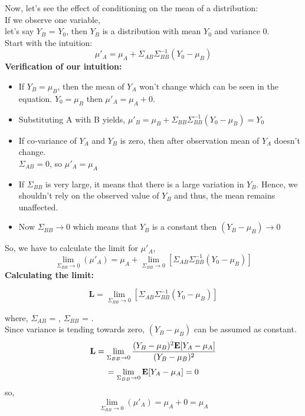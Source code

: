 \documentclass[12pt]{article}
\begin{document}
 \noindent
 Now, let's see the effect of conditioning on the mean of a distribution:\\
If we observe one variable,\\
 let's say $Y_B$ = $Y_0$, then $Y_B$ is a distribution with mean $Y_0$ and variance 0. \\
 Start with the intuition:  \\
 
 
 \begin{equation}
     \mu'_A = \mu_A + \Sigma_{AB}\Sigma_{BB}^{-1}(Y_0-\mu_B)
 \end{equation}
\textbf{Verification of our intuition:}
\begin{itemize}
    \item If $Y_B = \mu_B$, then the mean of $Y_A$ won't change which can be seen in the equation. $Y_0 = \mu_B$ then $\mu'_A = \mu_A + 0$.
    \item Substituting A with B yields, $\mu'_B = \mu_B + \Sigma_{BB}\Sigma_{BB}^{-1}(Y_0-\mu_B)=Y_0$ 
    \item If co-variance of $Y_A$ and $Y_B$ is zero, then after observation mean of $Y_A$ doesn't change.\\
    $\Sigma_{AB}=0$, so $\mu'_A = \mu_A $
    \item If $\Sigma_{BB}$ is very large, it means that there is a large variation in $Y_B$. Hence, we shouldn't rely on the observed value of $Y_B$  and thus, the mean remains unaffected.
    \item Now $\Sigma_{BB}\rightarrow0$ which means that $Y_B$ is a constant then $(Y_B-\mu_B) \rightarrow 0$
\end{itemize}
So, we have to calculate the limit for $\mu'_A$,
\begin{equation}
    \lim_{\Sigma_{BB}\rightarrow0}(\mu'_{A}) = \mu_A + \lim_{\Sigma_{BB}\rightarrow0}[\Sigma_{AB}\Sigma_{BB}^{-1}(Y_0-\mu_B)]
\end{equation}
\newpage
\noindent
\textbf{Calculating the limit:}

\begin{equation}
    \textbf{L} = \lim_{\Sigma_{BB}\rightarrow0}[\Sigma_{AB}\Sigma_{BB}^{-1}(Y_0-\mu_B)]
\end{equation}
    
\noindent
where,
$\Sigma_{AB}$ = \E[$(Y_A-\mu_A)(Y_B-\mu_B)$],  $\Sigma_{BB}$ = \E[$(Y_B-\mu_B)^2$].\\

\noindent
Since variance is tending towards zero, $(Y_B-\mu_B)$ can be assumed as constant.
\begin{equation}
      \textbf{L} = \lim_{\Sigma_{BB}\rightarrow0}\frac{(Y_B-\mu_B)^2{\bf E}[Y_A-\mu_A]}{(Y_B-\mu_B)^2}
\end{equation}
\begin{equation}
= \lim_{\Sigma_{BB}\rightarrow0}{\bf E}[Y_A-\mu_A] = 0
\end{equation}
so,
\begin{equation}
    \lim_{\Sigma_{BB}\rightarrow0}(\mu'_A) = \mu_A + 0 = \mu_A
\end{equation}
\end{document}
